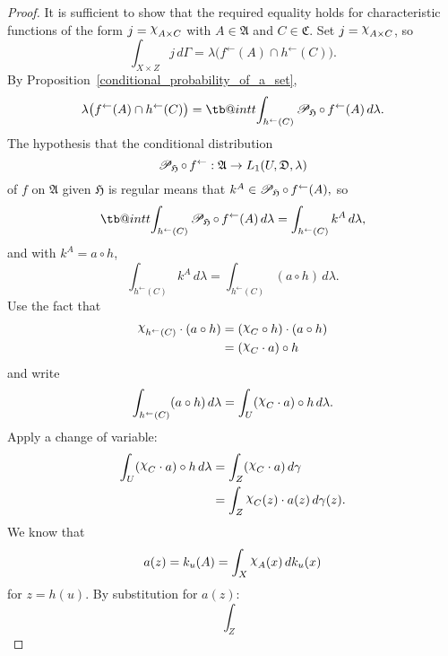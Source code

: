 \documentclass[
twoside=true,
paper=letter,
fontsize=9pt,
pagesize=auto,
leqno,
openany,
headsepline,
overfullrule,
]{scrbook}
\makeatletter
\theoremstyle{plain}
\theoremstyle{plain}
\theoremstyle{definition}
\theoremstyle{bfnoteitalic}
\theoremstyle{bfnoteroman}
\newcommand{\sigalg}[1]{\mathfrak{#1}}
\newcommand{\cali}[1]{\mathscr{#1}}
\newcommand{\condprobop}[1]{\mathop{\cali{P}\hspace{-1pt}}\nolimits_{#1}}
\newcommand{\charfunction}[1]{{\raisebox{2pt}{$\chi$}}_{#1}}
\newcommand{\preimage}[1]{#1^{\leftarrow}}
\newcommand{\meets}{\cap}
\newcommand{\sigmaalgebra}{\sigalg{A}}
\newcommand{\sigmaalgebraiii}{\sigalg{C}}
\newcommand{\funcf}{f}
\newcommand{\funch}{h}
\newcommand{\funcj}{j}
\newcommand{\funck}{k}
\newcommand{\function}{f}
\newcommand{\measurespace}{X}
\newcommand{\measurespaceiii}{Z}
\newcommand{\mspaceelt}{x}
\newcommand{\mspaceeltiii}{z}
\newcommand{\measureiii}{\lambda}
\newcommand{\measlambda}{\lambda}
\newcommand{\seti}{A}
\newcommand{\setiii}{C}
\newcommand{\uspace}{U}%
\newcommand{\uspaceelt}{u}
\newcommand{\uspacesig}{\sigalg{D}}
\newcommand{\measonprod}{\Gamma}%
\newcommand{\marginalthree}{\gamma}
\newcommand\tint{\mathop{\mathpalette\tb@int{t}}\!\int}
\newcommand\tb@int[2]{%
  \sbox\z@{$\m@th#1\int$}%
  \if#2t%
    \rlap{\hbox to\wd\z@{%
      \hfil
      \vrule width .35em height \dimexpr\ht\z@+1.4pt\relax depth -\dimexpr\ht\z@+1pt\relax
      \kern.05em %
    }}
  \else
    \rlap{\hbox to\wd\z@{%
      \vrule width .35em height -\dimexpr\dp\z@+1pt\relax depth \dimexpr\dp\z@+1.4pt\relax
      \hfil
    }}
  \fi
}
\newcommand{\inducedint}{\tint}
\makeatother
\begin{document}
\begin{proof}
It is sufficient to show that the required equality holds for characteristic functions of the form
$\funcj
=
\charfunction{\seti\times\setiii}$
with
$\seti\in\sigmaalgebra$
and
$\setiii\in\sigmaalgebraiii$.
Set
$\funcj
=
\charfunction{\seti\times\setiii}$,
so
\[
\int_{\measurespace\times\measurespaceiii}
\funcj
\, d\measonprod
=
\measlambda\bigl(\preimage{\funcf}(\seti)\meets \preimage{\funch}(\setiii)\bigr).
\]
By Proposition~\ref{conditional_probability_of_a_set},
\[
\measlambda\bigl(\preimage{\funcf}(\seti)\meets \preimage{\funch}(\setiii)\bigr)
=
\inducedint_{\preimage{\funch}(\setiii)}
\condprobop{\sigalg{H}}\circ\, \preimage{\function}(\seti)
\, d\measlambda.
\]
The hypothesis that the conditional distribution
\[
\condprobop{\sigalg{H}}\circ\, \preimage{\function}:
\sigmaalgebra \to L_1(\uspace,\uspacesig,\measureiii)
\]
of $\function$ on $\sigmaalgebra$ given $\sigalg{H}$
is regular means that
$\funck^\seti
\in
\condprobop{\sigalg{H}}\circ\, \preimage{\function}(\seti),$
so
\[
\inducedint_{\preimage{\funch}(\setiii)}
\condprobop{\sigalg{H}}\circ\, \preimage{\function}(\seti)
\, d\measlambda
=
\int_{\preimage{\funch}(\setiii)}
\funck^\seti \, d\measlambda,
\]
and with $\funck^\seti = a\circ \funch$,
\[
\int_{\preimage{\funch}(\setiii)}
\funck^\seti \, d\measlambda
=
\int_{\preimage{\funch}(\setiii)}
( a\circ\funch ) \, d\measlambda.
\]
Use the fact that
\begin{align*}
\charfunction{\preimage{\funch}(\setiii)}\cdot(a\circ\funch)
& =
(\charfunction{\setiii}\circ \funch)\cdot(a\circ\funch) \\
& =
(\charfunction{\setiii}\cdot a)\circ \funch \\
\end{align*}
and write
\[
\int_{\preimage{\funch}(\setiii)}
( a\circ\funch ) \, d\measlambda
=
\int_\uspace
(\charfunction{\setiii}\cdot a)\circ \funch
\, d\measlambda.
\]
Apply a change of variable:
\begin{align*}
\int_\uspace
(\charfunction{\setiii}\cdot a)\circ \funch
\, d\measlambda
& =
\int_\measurespaceiii
(\charfunction{\setiii}\cdot a)\, d\marginalthree \\
& =
\int_\measurespaceiii
\charfunction{\setiii}(\mspaceeltiii)
\cdot
a(\mspaceeltiii)\, d\marginalthree(\mspaceeltiii).
\end{align*}
We know that
\[
a(\mspaceeltiii)
=
\funck_\uspaceelt(\seti)
=
\int_\measurespace
\charfunction{\seti} (\mspaceelt)
\, d\funck_\uspaceelt (\mspaceelt)
\]
for $\mspaceeltiii = \funch(\uspaceelt)$.
By substitution for $a(\mspaceeltiii)$:
\[
\int_\measurespaceiii
\]
\end{proof}
\end{document}
